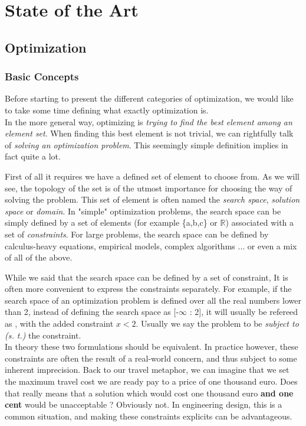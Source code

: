
\chapter{State of the Art}

\section{Optimization}

\subsection{Basic Concepts}

Before starting to present the different categories of optimization, we would like to take some time defining what exactly optimization is.\\
In the more general way, optimizing is \emph{trying to find the best element among an element set}. When finding this best element is not trivial, we can rightfully talk of \emph{solving an optimization problem}. This seemingly simple definition implies in fact quite a lot.

First of all it requires we have a defined set of element to choose from. As we will see, the topology of the set is of the utmost importance for choosing the way of solving the problem. This set of element is often named the \emph{search space}, \emph{solution space} or \emph{domain}. In "simple" optimization problems, the search space can be simply defined by a set of elements (for example \{a,b,c\} or \ensuremath{\mathbb{R}}) associated with a set of \emph{constraints}. For large problems, the search space can be defined by calculus-heavy equations, empirical models, complex algorithms ... or even a mix of all of the above.


While we said that the search space can be defined by a set of constraint, It is often more convenient to express the constraints separately. For example, if the search space of an optimization problem is defined over all the real numbers lower than 2, instead of defining the search space as [-\(\infty\) : 2], it will usually be refereed as , with the added constraint \(x < 2\). Usually we say the problem to be \emph{subject to (s. t.)} the constraint.\\
In theory these two formulations should be equivalent. In practice however, these constraints are often the result of a real-world concern, and thus subject to some inherent imprecision. Back to our travel metaphor, we can imagine that we set the maximum travel cost we are ready pay to a price of one thousand euro. Does that really means that a solution which would cost one thousand euro \textbf{and one cent} would be unacceptable ? Obviously not.  In engineering design, this is a common situation, and making these constraints explicits can be advantageous.

